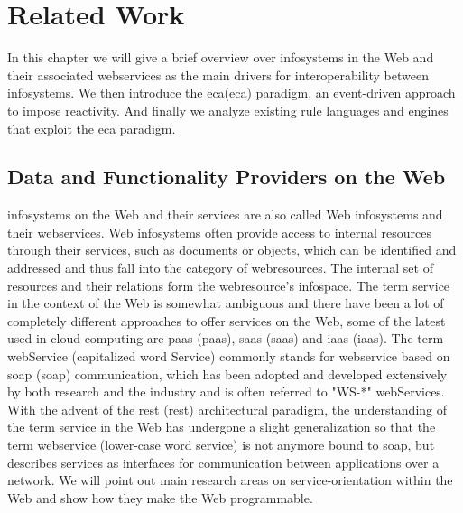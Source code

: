
\chapter{Related Work}

In this chapter we will give a brief overview over \textrm{\glspl{infosystem}} in the Web and their associated \textrm{\glspl{webservice}} as the main drivers for interoperability between \textrm{\glspl{infosystem}}.
We then introduce the \textrm{\acrlong{eca}(\acrshort{eca})} paradigm, an event-driven approach to impose reactivity.
And finally we analyze existing rule languages and engines that exploit the \textrm{\acrshort{eca}} paradigm.



\section{Data and Functionality Providers on the Web}
\textrm{\glspl{infosystem}} on the Web and their services are also called \textrm{Web \glspl{infosystem}} and their \textrm{\glspl{webservice}}.
\textrm{Web \glspl{infosystem}} often provide access to internal resources through their services, such as documents or objects, which can be identified and addressed and thus fall into the category of \textrm{\glspl{webresource}}.
The internal set of resources and their relations form the \textrm{\gls{webresource}}'s \textrm{\gls{infospace}}\cite{newby1996metric}.
The term service in the context of the Web is somewhat ambiguous and there have been a lot of completely different approaches to offer services on the Web, some of the latest used in cloud computing are \textrm{\acrlong{paas} (\acrshort{paas})}, \textrm{\acrlong{saas} (\acrshort{saas})} and \textrm{\acrlong{iaas} (\acrshort{iaas})}.
The term \textrm{\gls{webService}} (capitalized word \textrm{Service}) commonly stands for \textrm{\gls{webservice}} based on \textrm{\acrlong{soap} (\acrshort{soap})} communication\cite{journals/itpro/BarrosD06}, which has been adopted and developed extensively by both research and the industry and is often referred to "WS-*" \textrm{\glspl{webService}}.
With the advent of the \textrm{\acrlong{rest} (\acrshort{rest})} architectural paradigm, the understanding of the term service in the Web has undergone a slight generalization so that the term \textrm{\gls{webservice}} (lower-case word \textrm{service}) is not anymore bound to \textrm{\acrshort{soap}}, but describes services as interfaces for communication between applications over a network\cite{richardson2008restful}.
We will point out main research areas on service-orientation within the Web and show how they make the Web programmable.


